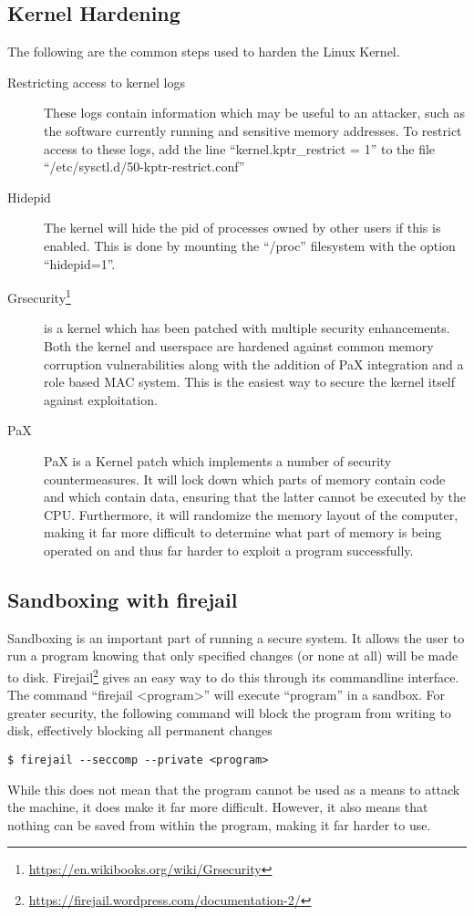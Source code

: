 			\subsection{Kernel Hardening}
				The following are the common steps used to harden the Linux Kernel.
				\begin{description}
					\item[Restricting access to kernel logs]
						These logs contain information which may be useful to an attacker, such as the software currently running and sensitive memory addresses.
						To restrict access to these logs, add the line ``kernel.kptr\_restrict = 1'' to the file ``/etc/sysctl.d/50-kptr-restrict.conf''
					\item[Hidepid]
						The kernel will hide the pid of processes owned by other users if this is enabled. This is done by mounting the ``/proc'' filesystem with the option ``hidepid=1''.
					\item[Grsecurity\footnote{\url{https://en.wikibooks.org/wiki/Grsecurity}}]
						is a kernel which has been patched with multiple security enhancements.
						Both the kernel and userspace are hardened against common memory corruption vulnerabilities along with the addition of PaX integration and a role based MAC system. This is the easiest way to secure the kernel itself against exploitation.
					\item[PaX] PaX is a Kernel patch which implements a number of security countermeasures.
						It will lock down which parts of memory contain code and which contain data, ensuring that the latter cannot be executed by the CPU.
						Furthermore, it will randomize the memory layout of the computer, making it far more difficult to determine what part of memory is being operated on and thus far harder to exploit a program successfully.
				\end{description}
				\subsection{Sandboxing with firejail}
					Sandboxing is an important part of running a secure system.
					It allows the user to run a program knowing that only specified changes (or none at all) will be made to disk.
					Firejail\footnote{\url{https://firejail.wordpress.com/documentation-2/}} gives an easy way to do this through its commandline interface.
					The command ``firejail <program>'' will execute ``program'' in a sandbox.
					For greater security, the following command will block the program from writing to disk, effectively blocking all permanent changes
					\begin{lstlisting}[style=CLI]
						$ firejail --seccomp --private <program>
					\end{lstlisting}
					While this does not mean that the program cannot be used as a means to attack the machine, it does make it far more difficult.
					However, it also means that nothing can be saved from within the program, making it far harder to use.
